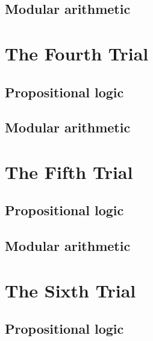  
\subsection{Modular arithmetic}



\section{The Fourth Trial} 

\subsection{Propositional logic}

 
\subsection{Modular arithmetic}



\section{The Fifth Trial} 

\subsection{Propositional logic}

 
\subsection{Modular arithmetic}



\section{The Sixth Trial} 

\subsection{Propositional logic}

 
